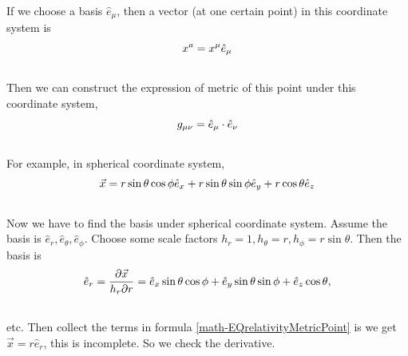 \documentclass[letterpaper,10pt,english]{sphinxmanual}
\begin{document}
If we choose a basis $\hat e_\mu$, then a vector (at one certain point) in this coordinate system is
\begin{gather}
\begin{split}x^a=x^\mu \hat e_\mu\end{split}\notag\\\begin{split}\end{split}\notag
\end{gather}
Then we can construct the expression of metric of this point under this coordinate system,
\begin{gather}
\begin{split}g_{\mu\nu}=\hat e_\mu\cdot \hat e_\nu\end{split}\notag\\\begin{split}\end{split}\notag
\end{gather}
For example, in spherical coordinate system,
\label{math:equation-EQrelativityMetricPoint}\begin{gather}
\begin{split}\vec x=r\sin \theta\cos\phi \hat e_x+r\sin\theta\sin\phi \hat e_y+r\cos\theta \hat e_z\end{split}\label{math-EQrelativityMetricPoint}\\\begin{split}\end{split}\notag
\end{gather}
Now we have to find the basis under spherical coordinate system. Assume the basis is $\hat e_r, \hat e_\theta, \hat e_\phi$. Choose some scale factors $h_r=1, h_\theta=r, h_\phi=r\sin\theta$. Then the basis is
\begin{gather}
\begin{split}\hat e_r=\frac{\partial \vec x}{h_r\partial r}=\hat e_x \sin\theta\cos\phi+\hat e_y \sin\theta\sin\phi+\hat e_z \cos\theta,\end{split}\notag\\\begin{split}\end{split}\notag
\end{gather}
etc. Then collect the terms in formula \eqref{math-EQrelativityMetricPoint} is we get $\vec x=r\hat e_r$, this is incomplete. So we check the derivative.
\end{document}

